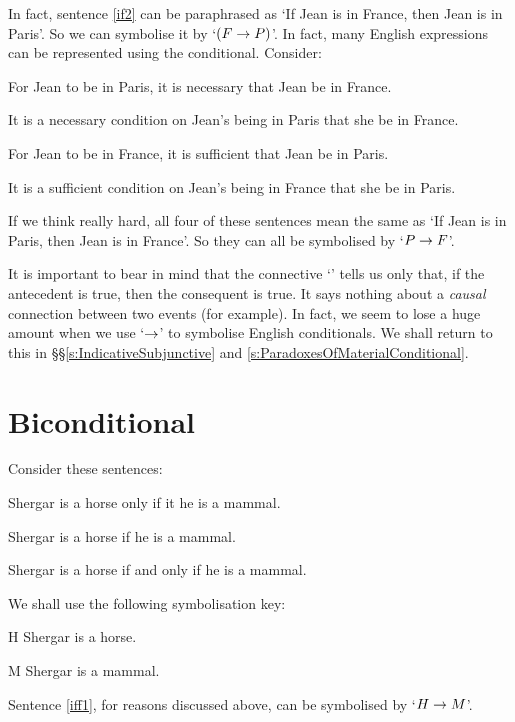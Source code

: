 In fact, sentence \ref{if2} can be paraphrased as `If Jean is in France, then Jean is in Paris'. So we can symbolise it by `$(F \rightarrow P)$'.
\noindent In fact, many English expressions can be represented using the conditional. Consider:
	\begin{earg}
		\item[\ex{ifnec1}] For Jean to be in Paris, it is necessary that Jean be in France.
		\item[\ex{ifnec2}] It is a necessary condition on Jean's being in Paris that she be in France. 
		\item[\ex{ifsuf1}] For Jean to be in France, it is sufficient that Jean be in Paris.
		\item[\ex{ifsuf2}] It is a sufficient condition on Jean's being in France that she be in Paris.
	\end{earg}
If we think really hard, all four of these sentences mean the same as  `If Jean is in Paris, then Jean is in France'. So they can all be symbolised by `$P \rightarrow F$'. 

It is important to bear in mind that the connective `\eif' tells us only that, if the antecedent is true, then the consequent is true. It says nothing about a \emph{causal} connection between two events (for example). In fact, we seem to lose a huge amount when we use `$\rightarrow$' to symbolise English conditionals. We shall return to this in \S§\ref{s:IndicativeSubjunctive} and \ref{s:ParadoxesOfMaterialConditional}.

\section{Biconditional}
Consider these sentences:
\begin{earg}
	\item[\ex{iff1}] Shergar is a horse only if it he is a mammal.
	\item[\ex{iff2}] Shergar is a horse if he is a mammal.
	\item[\ex{iff3}] Shergar is a horse if and only if he is a mammal.
\end{earg}
We shall use the following symbolisation key:
	\begin{ekey}
		\item[H] Shergar is a horse.
		\item[M] Shergar is a mammal.
	\end{ekey}
Sentence \ref{iff1}, for reasons discussed above, can be symbolised by `$H \rightarrow M$'.

